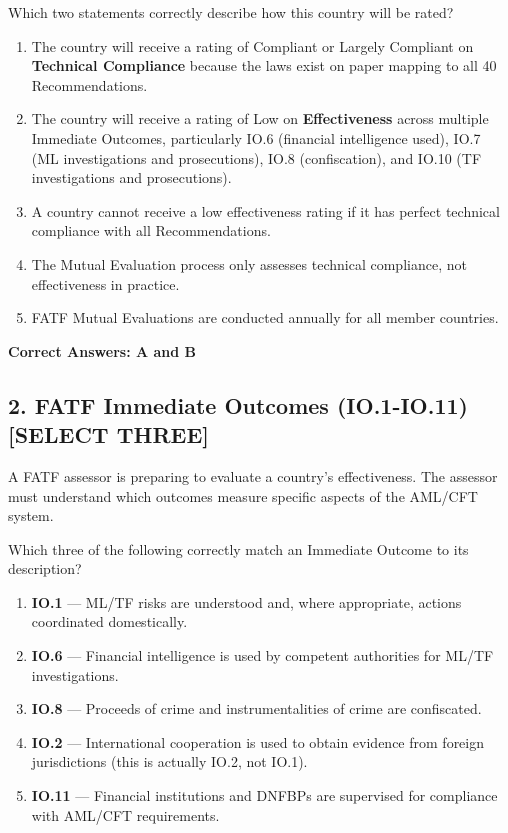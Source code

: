\documentclass[11pt,a4paper]{article}
\begin{document}
	Which two statements correctly describe how this country will be rated?
	
	\begin{enumerate}[label=\Alph*.]
		\item The country will receive a rating of Compliant or Largely Compliant on \textbf{Technical Compliance} because the laws exist on paper mapping to all 40 Recommendations.
		\item The country will receive a rating of Low on \textbf{Effectiveness} across multiple Immediate Outcomes, particularly IO.6 (financial intelligence used), IO.7 (ML investigations and prosecutions), IO.8 (confiscation), and IO.10 (TF investigations and prosecutions).
		\item A country cannot receive a low effectiveness rating if it has perfect technical compliance with all Recommendations.
		\item The Mutual Evaluation process only assesses technical compliance, not effectiveness in practice.
		\item FATF Mutual Evaluations are conducted annually for all member countries.
	\end{enumerate}
	
	\textbf{Correct Answers: A and B}
	
	\subsection{2. FATF Immediate Outcomes (IO.1-IO.11) \textnormal{[SELECT THREE]}}
	
	A FATF assessor is preparing to evaluate a country's effectiveness. The assessor must understand which outcomes measure specific aspects of the AML/CFT system.
	
	Which three of the following correctly match an Immediate Outcome to its description?
	
	\begin{enumerate}[label=\Alph*.]
		\item \textbf{IO.1} — ML/TF risks are understood and, where appropriate, actions coordinated domestically.
		\item \textbf{IO.6} — Financial intelligence is used by competent authorities for ML/TF investigations.
		\item \textbf{IO.8} — Proceeds of crime and instrumentalities of crime are confiscated.
		\item \textbf{IO.2} — International cooperation is used to obtain evidence from foreign jurisdictions (this is actually IO.2, not IO.1).
		\item \textbf{IO.11} — Financial institutions and DNFBPs are supervised for compliance with AML/CFT requirements.
	\end{enumerate}
	
\end{document}
